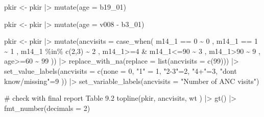 \documentclass[
  letterpaper,
  DIV=11,
  numbers=noendperiod]{scrartcl}
\newenvironment{Shaded}{\begin{snugshade}}{\end{snugshade}}
\newcommand{\AttributeTok}[1]{\textcolor[rgb]{0.40,0.45,0.13}{#1}}
\newcommand{\CommentTok}[1]{\textcolor[rgb]{0.37,0.37,0.37}{#1}}
\newcommand{\DecValTok}[1]{\textcolor[rgb]{0.68,0.00,0.00}{#1}}
\newcommand{\FunctionTok}[1]{\textcolor[rgb]{0.28,0.35,0.67}{#1}}
\newcommand{\NormalTok}[1]{\textcolor[rgb]{0.00,0.23,0.31}{#1}}
\newcommand{\OtherTok}[1]{\textcolor[rgb]{0.00,0.23,0.31}{#1}}
\newcommand{\SpecialCharTok}[1]{\textcolor[rgb]{0.37,0.37,0.37}{#1}}
\newcommand{\StringTok}[1]{\textcolor[rgb]{0.13,0.47,0.30}{#1}}
\begin{document}
\begin{Shaded}
\begin{Highlighting}[]
\NormalTok{ pkir }\OtherTok{\textless{}{-}}\NormalTok{ pkir }\SpecialCharTok{|\textgreater{}}
   \FunctionTok{mutate}\NormalTok{(}\AttributeTok{age =}\NormalTok{ b19\_01)}

\NormalTok{pkir }\OtherTok{\textless{}{-}}\NormalTok{ pkir }\SpecialCharTok{|\textgreater{}}
  \FunctionTok{mutate}\NormalTok{(}\AttributeTok{age =}\NormalTok{ v008 }\SpecialCharTok{{-}}\NormalTok{ b3\_01)}


\NormalTok{pkir }\OtherTok{\textless{}{-}}\NormalTok{ pkir }\SpecialCharTok{|\textgreater{}}
  \FunctionTok{mutate}\NormalTok{(}\AttributeTok{ancvisits =}
           \FunctionTok{case\_when}\NormalTok{(}
\NormalTok{             m14\_1 }\SpecialCharTok{==} \DecValTok{0} \SpecialCharTok{\textasciitilde{}} \DecValTok{0}\NormalTok{ ,}
\NormalTok{             m14\_1 }\SpecialCharTok{==} \DecValTok{1} \SpecialCharTok{\textasciitilde{}} \DecValTok{1}\NormalTok{ ,}
\NormalTok{             m14\_1  }\SpecialCharTok{\%in\%} \FunctionTok{c}\NormalTok{(}\DecValTok{2}\NormalTok{,}\DecValTok{3}\NormalTok{)   }\SpecialCharTok{\textasciitilde{}} \DecValTok{2}\NormalTok{ ,}
\NormalTok{             m14\_1}\SpecialCharTok{\textgreater{}=}\DecValTok{4} \SpecialCharTok{\&}\NormalTok{ m14\_1}\SpecialCharTok{\textless{}=}\DecValTok{90}  \SpecialCharTok{\textasciitilde{}} \DecValTok{3}\NormalTok{ ,}
\NormalTok{             m14\_1}\SpecialCharTok{\textgreater{}}\DecValTok{90}  \SpecialCharTok{\textasciitilde{}} \DecValTok{9}\NormalTok{ ,}
\NormalTok{             age}\SpecialCharTok{\textgreater{}=}\DecValTok{60} \SpecialCharTok{\textasciitilde{}} \DecValTok{99}\NormalTok{ )) }\SpecialCharTok{|\textgreater{}}
  \FunctionTok{replace\_with\_na}\NormalTok{(}\AttributeTok{replace =} \FunctionTok{list}\NormalTok{(}\AttributeTok{ancvisits =} \FunctionTok{c}\NormalTok{(}\DecValTok{99}\NormalTok{))) }\SpecialCharTok{|\textgreater{}}
  \FunctionTok{set\_value\_labels}\NormalTok{(}\AttributeTok{ancvisits =} \FunctionTok{c}\NormalTok{(}\AttributeTok{none =} \DecValTok{0}\NormalTok{, }\StringTok{"1"} \OtherTok{=} \DecValTok{1}\NormalTok{, }\StringTok{"2{-}3"}\OtherTok{=}\DecValTok{2}\NormalTok{, }\StringTok{"4+"}\OtherTok{=}\DecValTok{3}\NormalTok{, }\StringTok{"don\textquotesingle{}t know/missing"}\OtherTok{=}\DecValTok{9}\NormalTok{  )) }\SpecialCharTok{|\textgreater{}}
  \FunctionTok{set\_variable\_labels}\NormalTok{(}\AttributeTok{ancvisits =} \StringTok{"Number of ANC visits"}\NormalTok{)}

\CommentTok{\# check with final report Table 9.2}
\FunctionTok{topline}\NormalTok{(pkir, ancvisits, wt ) }\SpecialCharTok{|\textgreater{}} \FunctionTok{gt}\NormalTok{() }\SpecialCharTok{|\textgreater{}} \FunctionTok{fmt\_number}\NormalTok{(}\AttributeTok{decimals =} \DecValTok{2}\NormalTok{)}
\end{Highlighting}
\end{Shaded}
\end{document}

